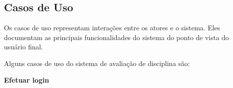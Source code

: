 \subsection{Casos de Uso}
Os casos de uso representam interações entre os atores e o sistema. Eles documentam as principais funcionalidades do sistema do ponto de vista do usuário final. 

Alguns casos de uso do sistema de avaliação de disciplina são:

\begin{alineas}
    \item \textbf{Efetuar login}
\end{alineas}

\begin{comment}
    \begin{table}[h]
        \centering
        \caption{Casos de Uso}
        \label{tab:tabela_casos_de_uso}
        \resizebox{\textwidth}{!}{%
        \rowcolors{1}{}{lightlightgray}
        \begin{tabular}{cccc}
        \hline
        \textbf{ID} & \textbf{Nome} & \textbf{Ator} & \textbf{Descrição} \\ \hline
        \textbf{UC01} & Efetuar login & \begin{tabular}[c]{@{}c@{}}Aluno, Coordenador\\ ou Professor\end{tabular} & \begin{tabular}[c]{@{}c@{}}Autenticação de usuários cadastrados no sistema,\\ permitindo a realização de operações restritas à cada perfil\end{tabular} \\
        \textbf{UC02} & Cadatrar usuário & Coordenador & \begin{tabular}[c]{@{}c@{}}Inclusão no sistema usuários para  executar as operações de acordo \\ com o perfil (Aluno ou Professor)\end{tabular} \\
        \textbf{UC03} & Visualizar disciplina & Aluno ou Professor & Visualização das informações da disciplina: Ano letivo, professor \\
        \textbf{UC04} & Avaliar disciplina & Aluno & Avaliação da disciplina cursada no ano letivo em questão \\
        \textbf{UC05} & Cadastrar disciplina & Coordenador & \begin{tabular}[c]{@{}c@{}}Cadastro de uma disciplina no sistema informando NOME, PERÍODO LETIVO, \\ TURNO e PROFESSOR\end{tabular} \\
        \textbf{UC06} & Cadastrar período & Professor & Cadastro de ano letivo no sistema (ANO) \\
        \textbf{UC07} & Visualizar relatório & Coordenador ou Professor & Visualização das avaliações feitas pelos alunos da disciplina
        \end{tabular}%
        }
    \end{table}
\end{comment}



